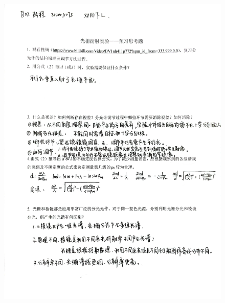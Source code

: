 \documentclass[UTF8]{ctexart}
\begin{document}
\begin{figure}[H]
  \centering
  \includegraphics[scale=0.14]{预习.jpg}
\end{figure}
\end{document}
